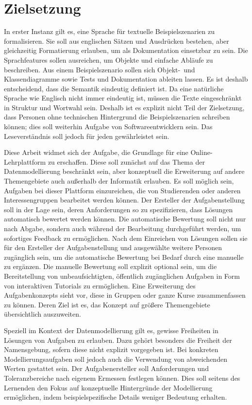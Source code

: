 \chapter{Zielsetzung}\label{ch:goals}

In erster Instanz gilt es, eine Sprache für textuelle Beispielszenarien zu formalisieren.
Sie soll aus englischen Sätzen und Ausdrücken bestehen, aber gleichzeitig Formatierung erlauben, um als Dokumentation einsetzbar zu sein.
Die Sprachfeatures sollen ausreichen, um Objekte und einfache Abläufe zu beschreiben.
Aus einem Beispielszenario sollen sich Objekt-\ und Klassendiagramme sowie Tests und Dokumentation ableiten lassen.
Es ist deshalb entscheidend, dass die Semantik eindeutig definiert ist.
Da eine natürliche Sprache wie Englisch nicht immer eindeutig ist, müssen die Texte eingeschränkt in Struktur und Wortwahl sein.
Deshalb ist es explizit nicht Teil der Zielsetzung, dass Personen ohne technischen Hintergrund die Beispielszenarien schreiben können;
dies soll weiterhin Aufgabe von Softwareentwicklern sein.
Das Leseverständnis soll jedoch für jeden gewährleistet sein.

Diese Arbeit widmet sich der Aufgabe, die Grundlage für eine Online-Lehrplattform zu erschaffen.
Diese soll zunächst auf das Thema der Datenmodellierung beschränkt sein, aber konzeptuell die Erweiterung auf andere Themengebiete auch außerhalb der Informatik erlauben.
Es soll möglich sein, Aufgaben bei dieser Plattform einzureichen, die von Studierenden oder anderen Interessengruppen bearbeitet werden können.
Der Ersteller der Aufgabenstellung soll in der Lage sein, deren Anforderungen so zu spezifizieren, dass Lösungen automatisch bewertet werden können.
Die automatische Bewertung soll nicht nur nach Abgabe, sondern auch während der Bearbeitung durchgeführt werden, um sofortiges Feedback zu ermöglichen.
Nach dem Einreichen von Lösungen sollen sie für den Ersteller der Aufgabenstellung und ausgewählte weitere Personen zugänglich sein, um die automatische Bewertung bei Bedarf durch eine manuelle zu ergänzen.
Die manuelle Bewertung soll explizit optional sein, um die Bereitstellung von unbeaufsichtigten, öffentlich zugänglichen Aufgaben in Form von interaktiven Tutorials zu ermöglichen.
Eine Erweiterung des Aufgabenkonzepts sieht vor, diese in Gruppen oder ganze Kurse zusammenfassen zu können.
Deren Ziel ist es, das Konzept auf größere Themengebiete übersichtlich auszuweiten.

Speziell im Kontext der Datenmodellierung gilt es, gewisse Freiheiten in Lösungen von Aufgaben zu erlauben.
Dazu gehört besonders die Freiheit der Namensgebung, sofern diese nicht explizit vorgegeben ist.
Bei konkreten Modellierungsaufgaben soll jedoch auch die Verwendung von abweichenden Werten gestattet sein.
Der Aufgabenersteller soll Anforderungen und Toleranzbereiche nach eigenem Ermessen festlegen können.
Dies soll seitens des Lernenden den Fokus auf konzeptuelle Hintergründe der Modellierung ermöglichen, indem beispielspezifische Details weniger Bedeutung erhalten.
